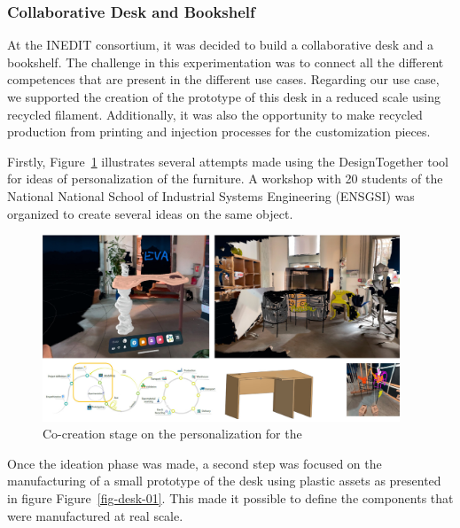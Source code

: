 \documentclass[
  11pt,
]{article}
\begin{document}
\hypertarget{collaborative-desk-and-bookshelf}{%
\subsubsection{Collaborative Desk and
Bookshelf}\label{collaborative-desk-and-bookshelf}}

At the INEDIT consortium, it was decided to build a collaborative desk
and a bookshelf. The challenge in this experimentation was to connect
all the different competences that are present in the different use
cases. Regarding our use case, we supported the creation of the
prototype of this desk in a reduced scale using recycled filament.
Additionally, it was also the opportunity to make recycled production
from printing and injection processes for the customization pieces.

Firstly, Figure~\ref{fig-desk-00} illustrates several attempts made
using the DesignTogether tool for ideas of personalization of the
furniture. A workshop with 20 students of the National National School
of Industrial Systems Engineering (ENSGSI) was organized to create
several ideas on the same object.

\begin{figure}[H]

{\centering \includegraphics[width=0.95\textwidth,height=\textheight]{figures/demos/desk/desk-00.jpg}

}

\caption{\label{fig-desk-00}Co-creation stage on the personalization for
the}

\end{figure}

Once the ideation phase was made, a second step was focused on the
manufacturing of a small prototype of the desk using plastic assets as
presented in figure Figure~\ref{fig-desk-01}. This made it possible to
define the components that were manufactured at real scale.
\end{document}
